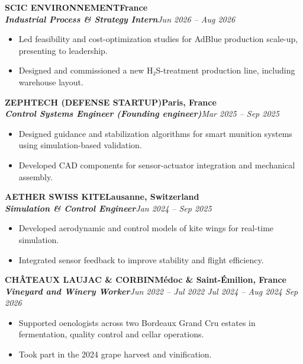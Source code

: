\documentclass[10pt]{article}
\newcommand{\company}[2]{\noindent\textbf{\uppercase{#1}}\hfill \textbf{#2}}
\newcommand{\role}[2]{\textit{\textbf{#1}}\hfill\textit{#2}}
\begin{document}
\company{SCIC Environnement}{France}\\
\role{Industrial Process \& Strategy Intern}{Jun 2026 – Aug 2026}
\begin{itemize}[leftmargin=*,nosep,label={\scriptsize\textbullet}]
    \item Led feasibility and cost-optimization studies for AdBlue production scale-up, presenting to leadership.
    \item Designed and commissioned a new H₂S-treatment production line, including warehouse layout.
\end{itemize}

\company{Zephtech (Defense startup)}{Paris, France}\\
\role{Control Systems Engineer (Founding engineer)}{Mar 2025 – Sep 2025}
\begin{itemize}[leftmargin=*,nosep,label={\scriptsize\textbullet}]
    \item Designed guidance and stabilization algorithms for smart munition systems using simulation-based validation.
    \item Developed CAD components for sensor-actuator integration and mechanical assembly.
\end{itemize}

\company{Aether Swiss Kite}{Lausanne, Switzerland}\\
\role{Simulation \& Control Engineer}{Jan 2024 – Sep 2025}
\begin{itemize}[leftmargin=*,nosep,label={\scriptsize\textbullet}]
    \item Developed aerodynamic and control models of kite wings for real-time simulation.
    \item Integrated sensor feedback to improve stability and flight efficiency.
\end{itemize}

\company{Châteaux Laujac \& Corbin}{Médoc \& Saint-Émilion, France}\\
\role{Vineyard and Winery Worker}{Jun 2022 – Jul 2022 \textbar{} Jul 2024 – Aug 2024 \textbar{} Sep 2026}
\begin{itemize}[leftmargin=*,nosep,label={\scriptsize\textbullet}]
    \item Supported oenologists across two Bordeaux Grand Cru estates in fermentation, quality control and cellar operations.
    \item Took part in the 2024 grape harvest and vinification.
\end{itemize}
\end{document}
